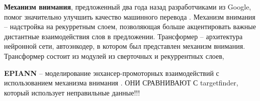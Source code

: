 {\bfseries Механизм внимания}, предложенный два года назад разработчиками из Google, помог значительно улучшить качество машинного перевода \cite{vaswani_attention_2017}. Механизм внимания -- надстройка на рекурретным слоем, позволяющая больше акцентировать важные дистантные взаимодействия слов в предложении. Трансформер -- архитектура нейронной сети, автоэнкодер, в котором был представлен механизм внимания. Трансформер состоит из модулей из сверточных и рекуррентных слоев,


{\bfseries EPIANN } --  моделирование энхансер-промоторных взаимодействий с использованием механизма внимания \cite{mao_modeling_2017}.
ОНИ СРАВНИВАЮТ С targetfinder, который использует неправильные данные!!!


